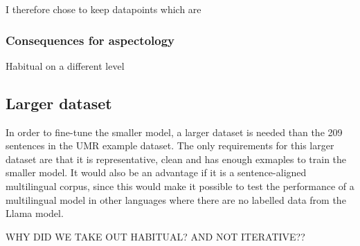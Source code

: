 I therefore chose to keep datapoints which are 

\subsubsection{Consequences for aspectology}
Habitual on a different level

\subsection{Larger dataset}
In order to fine-tune the smaller model, a larger dataset is needed than the 209 sentences in the UMR example dataset. The only requirements for this larger dataset are that it is representative, clean and has enough exmaples to train the smaller model. It would also be an advantage if it is a sentence-aligned multilingual corpus, since this would make it possible to test the performance of a multilingual model in other languages where there are no labelled data from the Llama model. 

WHY DID WE TAKE OUT HABITUAL? AND NOT ITERATIVE??
